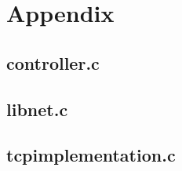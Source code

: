 \documentclass{article}
\begin{document}
\printbibliography

\section*{Appendix}

\subsection*{controller.c}


\subsection*{libnet.c}


\subsection*{tcp\textunderscore implementation.c}

\end{document}
